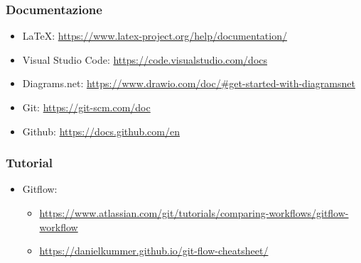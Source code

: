 \subsubsection{Documentazione}
\begin{itemize}
        \item \LaTeX: \url{https://www.latex-project.org/help/documentation/}
        \item Visual Studio Code: \url{https://code.visualstudio.com/docs}
        \item Diagrams.net: \url{https://www.drawio.com/doc/#get-started-with-diagramsnet}
        \item Git: \url{https://git-scm.com/doc}
        \item Github: \url{https://docs.github.com/en}
    \end{itemize}
\subsubsection{Tutorial}
\begin{itemize}
        \item Gitflow:
            \begin{itemize}
                \item \url{https://www.atlassian.com/git/tutorials/comparing-workflows/gitflow-workflow}
                \item \url{https://danielkummer.github.io/git-flow-cheatsheet/}
            \end{itemize}       
                        
    \end{itemize}